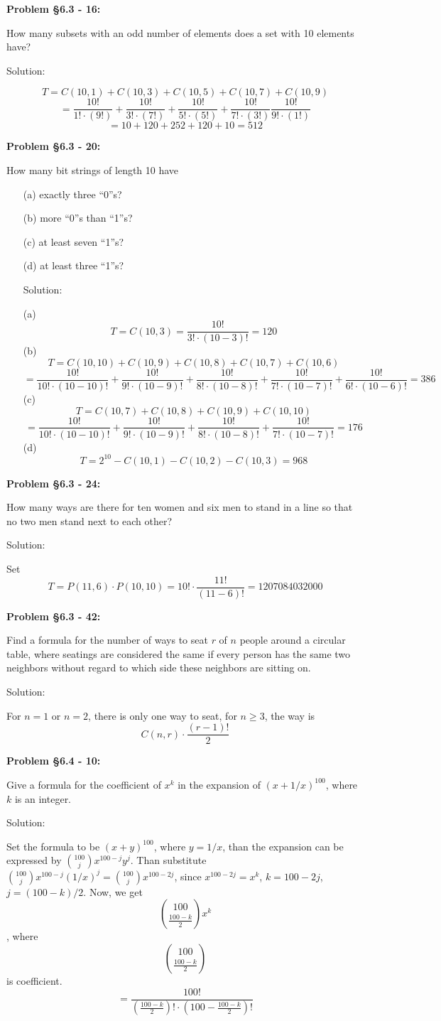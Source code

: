 \documentclass{article}
\newenvironment{problem}[1]
{\begin{mdframed}[default]
\textbf{Problem #1:}
}
{\end{mdframed}
}
\begin{document}
\begin{problem}{\S 6.3 - 16}
How many subsets with an odd number of elements does a set with 10 elements have?

Solution:

\[T=C(10,1)+C(10,3)+C(10,5)+C(10,7)+C(10,9)\]
\[=\frac{10!}{1!\cdot(9!)}+\frac{10!}{3!\cdot(7!)}+\frac{10!}{5!\cdot(5!)}+\frac{10!}{7!\cdot(3!)}\frac{10!}{9!\cdot(1!)}\]
\[=10+120+252+120+10=512\]
\end{problem}
\begin{problem}{\S 6.3 - 20}
How many bit strings of length 10 have
\begin{enumerate}
\item[(a)] exactly three ``0''s?
\item[(b)] more ``0''s than ``1''s?
\item[(c)] at least seven ``1''s?
\item[(d)] at least three ``1''s?

Solution:

(a) \[T=C(10,3)=\frac{10!}{3!\cdot(10-3)!}=120\]
(b) \[T=C(10,10)+C(10,9)+C(10,8)+C(10,7)+C(10,6)\]
\[=\frac{10!}{10!\cdot(10-10)!}+\frac{10!}{9!\cdot(10-9)!}+\frac{10!}{8!\cdot(10-8)!}+\frac{10!}{7!\cdot(10-7)!}+\frac{10!}{6!\cdot(10-6)!}=386\]
(c)\[T=C(10,7)+C(10,8)+C(10,9)+C(10,10)\]
\[=\frac{10!}{10!\cdot(10-10)!}+\frac{10!}{9!\cdot(10-9)!}+\frac{10!}{8!\cdot(10-8)!}+\frac{10!}{7!\cdot(10-7)!}=176\]
(d)\[T=2^{10}-C(10,1)-C(10,2)-C(10,3)=968\]
\end{enumerate}
\end{problem}
\begin{problem}{\S 6.3 - 24}
How many ways are there for ten women and six men to stand in a line so that no two
men stand next to each other?

Solution:

Set 
\[T=P(11,6)\cdot P(10,10)={10!}\cdot \frac{11!}{(11-6)!}= 1207084032000\]
\end{problem}
\begin{problem}{\S 6.3 - 42}
Find a formula for the number of ways to seat $r$ of $n$ people around a circular
table, where seatings are considered the same if every person has the same two
neighbors without regard to which side these neighbors are sitting on.

Solution:

For $n=1$ or $n=2$, there is only one way to seat, for $n\geq 3$, the way is \[C(n,r)\cdot\frac{(r-1)!}{2} \]
\end{problem}
\begin{problem}{\S 6.4 - 10}
Give a formula for the coefficient of $x^k$ in the expansion of $(x+1/x)^{100}$,
where $k$ is an integer.

Solution:

Set the formula to be $(x+y)^{100}$, where $y=1/x$, than the expansion can be expressed by ${100 \choose j}x^{100-j}y^{j}$. Than substitute ${100 \choose j}x^{100-j}(1/x)^{j}={100 \choose j}x^{100-2j}$, since $x^{100-2j}=x^k$, $k=100-2j$, $j={(100-k)}/2$.
Now, we get \[{100 \choose \frac{100-k}{2}}x^k\], where\[{100 \choose \frac{100-k}{2}}\] is coefficient.\[=\frac{100!}{(\frac{100-k}{2})!\cdot(100-\frac{100-k}{2})!}\]

\end{problem}
\end{document}
